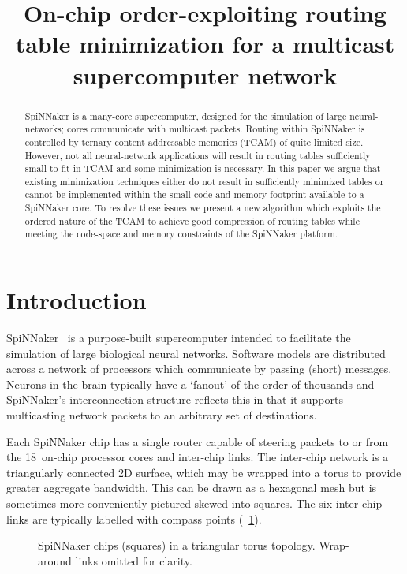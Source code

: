 \documentclass[conference]{IEEEtran}
\title{On-chip order-exploiting routing table minimization for a multicast supercomputer network}
\author{%
  \IEEEauthorblockN{Andrew~Mundy, Jonathan~Heathcote and Jim~D.~Garside}
  \IEEEauthorblockA{School of Computer Science,\\
                    University of Manchester, UK}
}
\begin{document}
  \maketitle

  \begin{abstract}
SpiNNaker is a many-core supercomputer, designed for the simulation of large neural-networks; cores communicate with multicast packets.
Routing within SpiNNaker is controlled by ternary content addressable memories (TCAM) of quite limited size.
However, not all neural-network applications will result in routing tables sufficiently small to fit in TCAM and some minimization is necessary.
In this paper we argue that existing minimization techniques either do not result in sufficiently minimized tables or cannot be implemented within the small code and memory footprint available to a SpiNNaker core.
To resolve these issues we present a new algorithm which exploits the ordered nature of the TCAM to achieve good compression of routing tables while meeting the code-space and memory constraints of the SpiNNaker platform.

  \end{abstract}

  \section{Introduction}

SpiNNaker~\parencite{Furber2014} is a purpose-built supercomputer intended to facilitate the simulation of large biological neural networks.
Software models are distributed across a network of processors which communicate by passing (short) messages.
Neurons in the brain typically have a `fanout' of the order of thousands \parencite{TODO} and SpiNNaker's interconnection structure reflects this in that it supports multicasting network packets to an arbitrary set of destinations.

Each SpiNNaker chip has a single router capable of steering packets to or from the 18~on-chip processor cores and inter-chip links.
The inter-chip network is a triangularly connected 2D surface, which may be wrapped into a torus to provide greater aggregate bandwidth.
This can be drawn as a hexagonal mesh but is sometimes more conveniently pictured skewed into squares.
The six inter-chip links are typically labelled with compass points (\figurename~\ref{fig:diagrams/topology}).

\begin{figure}[!b]
  
  \center
  
  
  \caption{SpiNNaker chips (squares) in a triangular torus topology. Wrap-around links omitted for clarity.}
  \label{fig:diagrams/topology}
  
\end{figure}
\end{document}
